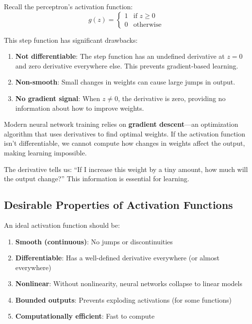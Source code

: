 Recall the perceptron's activation function:
\[
g(z) = \begin{cases} 1 & \text{if } z \geq 0 \\ 0 & \text{otherwise} \end{cases}
\]

This step function has significant drawbacks:

\begin{enumerate}
    \item \textbf{Not differentiable}: The step function has an undefined derivative at $z = 0$ and zero derivative everywhere else. This prevents gradient-based learning.
    
    \item \textbf{Non-smooth}: Small changes in weights can cause large jumps in output.
    
    \item \textbf{No gradient signal}: When $z \neq 0$, the derivative is zero, providing no information about how to improve weights.
\end{enumerate}

\begin{bluebox}
Modern neural network training relies on \textbf{gradient descent}---an optimization algorithm that uses derivatives to find optimal weights. If the activation function isn't differentiable, we cannot compute how changes in weights affect the output, making learning impossible.

The derivative tells us: ``If I increase this weight by a tiny amount, how much will the output change?'' This information is essential for learning.
\end{bluebox}

\subsection{Desirable Properties of Activation Functions}

An ideal activation function should be:

\begin{enumerate}
    \item \textbf{Smooth (continuous)}: No jumps or discontinuities
    \item \textbf{Differentiable}: Has a well-defined derivative everywhere (or almost everywhere)
    \item \textbf{Nonlinear}: Without nonlinearity, neural networks collapse to linear models
    \item \textbf{Bounded outputs}: Prevents exploding activations (for some functions)
    \item \textbf{Computationally efficient}: Fast to compute
\end{enumerate}

